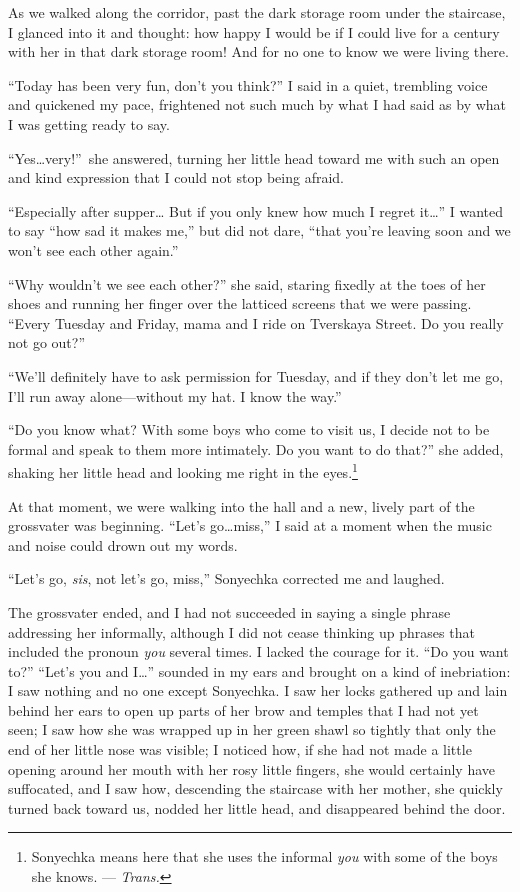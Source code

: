 As we walked along the corridor, past the dark storage room under the staircase, I glanced into it and thought: how happy I would be if I could live for a century with her in that dark storage room! And for no one to know we were living there.

``Today has been very fun, don't you think?'' I said in a quiet, trembling voice and quickened my pace, frightened not such much by what I had said as by what I was getting ready to say. %

``Yes\ldots{}very!''~she answered, turning her little head toward me with such an open and kind expression that I could not stop being afraid. %

``Especially after supper\ldots{} But if you only knew how much I regret it\ldots{}'' I wanted to say ``how sad it makes me,'' but did not dare, ``that you're leaving soon and we won't see each other again.'' %

``Why wouldn't we see each other?'' she said, staring fixedly at the toes of her shoes and running her finger over the latticed screens that we were passing. ``Every Tuesday and Friday, mama and I ride on Tverskaya Street. Do you really not go out?'' %

``We'll definitely have to ask permission for Tuesday, and if they don't let me go, I'll run away alone---without my hat. I know the way.'' %

``Do you know what? With some boys who come to visit us, I decide not to be formal and speak to them more intimately. Do you want to do that?'' she added, shaking her little head and looking me right in the eyes.\footnote{Sonyechka means here that she uses the informal \textit{you} with some of the boys she knows. --- \textit{Trans.}} %

At that moment, we were walking into the hall and a new, lively part of the grossvater was beginning. ``Let's go\ldots{}miss,'' I said at a moment when the music and noise could drown out my words.

``Let's go, \emph{sis}, not let's go, miss,'' Sonyechka corrected me and laughed. %

The grossvater ended, and I had not succeeded in saying a single phrase addressing her informally, although I did not cease thinking up phrases that included the pronoun \textit{you} several times. I lacked the courage for it. ``Do you want to?'' ``Let's you and I\ldots{}'' sounded in my ears and brought on a kind of inebriation: I saw nothing and no one except Sonyechka. I saw her locks gathered up and lain behind her ears to open up parts of her brow and temples that I had not yet seen; I saw how she was wrapped up in her green shawl so tightly that only the end of her little nose was visible; I noticed how, if she had not made a little opening around her mouth with her rosy little fingers, she would certainly have suffocated, and I saw how, descending the staircase with her mother, she quickly turned back toward us, nodded her little head, and disappeared behind the door.

